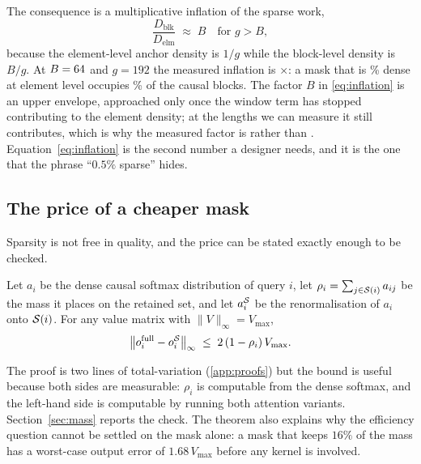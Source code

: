 The consequence is a multiplicative inflation of the sparse work,
\begin{equation}
\frac{D_{\mathrm{blk}}}{D_{\mathrm{elm}}} \;\approx\; B
\quad\text{for } g>B,
\label{eq:inflation}
\end{equation}
because the element-level anchor density is $1/g$ while the block-level density is
$B/g$. At $B=64$ and $g=192$ the measured inflation is
\BlockInflationAtRef{}$\times$: a mask that is \BlockElemDensPct\% dense at element level
occupies \BlockDensCausalAtB\% of the causal blocks. The factor $B$ in
\eqref{eq:inflation} is an upper envelope, approached only once the window term
has stopped contributing to the element density; at the lengths we can measure it
still contributes, which is why the measured factor is \BlockInflationAtRef{}
rather than \AlignBlock. Equation~\eqref{eq:inflation} is the second number a
designer needs, and it is the one that the phrase ``$0.5\%$ sparse'' hides.

\subsection{The price of a cheaper mask}

Sparsity is not free in quality, and the price can be stated exactly enough to be
checked.

\begin{theorem}\label{thm:mass}
Let $a_i$ be the dense causal softmax distribution of query $i$, let
$\rho_i=\sum_{j\in\mathcal{S}(i)}a_{ij}$ be the mass it places on the retained set, and
let $a^{\mathcal{S}}_i$ be the renormalisation of $a_i$ onto $\mathcal{S}(i)$. For any value
matrix with $\lVert V\rVert_\infty=V_{\max}$,
\begin{equation}
\big\lVert o_i^{\mathrm{full}} - o_i^{\mathcal{S}}\big\rVert_\infty
\;\le\; 2\,(1-\rho_i)\,V_{\max}.
\label{eq:massbound}
\end{equation}
\end{theorem}

The proof is two lines of total-variation (\ref{app:proofs}) but the
bound is useful because both sides are measurable: $\rho_i$ is computable from the
dense softmax, and the left-hand side is computable by running both attention
variants. Section~\ref{sec:mass} reports the check. The theorem also explains why
the efficiency question cannot be settled on the mask alone: a mask that keeps
$16\%$ of the mass has a worst-case output error of $1.68\,V_{\max}$ before any
kernel is involved.

